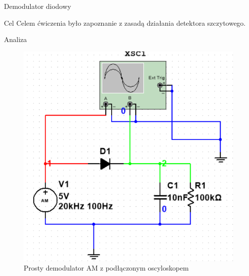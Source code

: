\documentclass[a4paper]{scrartcl}
\begin{document}
	\begin{section}{Demodulator diodowy}
		\begin{subsection}{Cel}
			Celem ćwiczenia było zapoznanie z zasadą działania detektora szczytowego.
		\end{subsection}
		\begin{subsection}{Analiza}
				\begin{figure}[ht]
				\begin{center}
					\includegraphics[width=0.4\linewidth]{exercise-5-circuit}
					\caption{Prosty demodulator AM z podłączonym oscyloskopem}
					\label{fig:circuit-5}
				\end{center}
				\end{figure}


\end{subsection}
\end{section}
\end{document}
